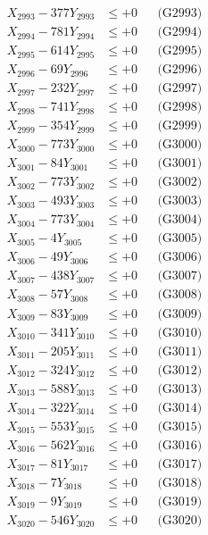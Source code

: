 \documentclass[a4paper,10pt]{article}
\begin{document}
{\begin{align}
X_{2993} - 377Y_{2993} &\leq +0 && \text{(G2993)} \\
X_{2994} - 781Y_{2994} &\leq +0 && \text{(G2994)} \\
X_{2995} - 614Y_{2995} &\leq +0 && \text{(G2995)} \\
X_{2996} - 69Y_{2996} &\leq +0 && \text{(G2996)} \\
X_{2997} - 232Y_{2997} &\leq +0 && \text{(G2997)} \\
X_{2998} - 741Y_{2998} &\leq +0 && \text{(G2998)} \\
X_{2999} - 354Y_{2999} &\leq +0 && \text{(G2999)} \\
X_{3000} - 773Y_{3000} &\leq +0 && \text{(G3000)} \\
\allowbreak
X_{3001} - 84Y_{3001} &\leq +0 && \text{(G3001)} \\
X_{3002} - 773Y_{3002} &\leq +0 && \text{(G3002)} \\
X_{3003} - 493Y_{3003} &\leq +0 && \text{(G3003)} \\
X_{3004} - 773Y_{3004} &\leq +0 && \text{(G3004)} \\
X_{3005} - 4Y_{3005} &\leq +0 && \text{(G3005)} \\
X_{3006} - 49Y_{3006} &\leq +0 && \text{(G3006)} \\
X_{3007} - 438Y_{3007} &\leq +0 && \text{(G3007)} \\
X_{3008} - 57Y_{3008} &\leq +0 && \text{(G3008)} \\
X_{3009} - 83Y_{3009} &\leq +0 && \text{(G3009)} \\
X_{3010} - 341Y_{3010} &\leq +0 && \text{(G3010)} \\
\allowbreak
X_{3011} - 205Y_{3011} &\leq +0 && \text{(G3011)} \\
X_{3012} - 324Y_{3012} &\leq +0 && \text{(G3012)} \\
X_{3013} - 588Y_{3013} &\leq +0 && \text{(G3013)} \\
X_{3014} - 322Y_{3014} &\leq +0 && \text{(G3014)} \\
X_{3015} - 553Y_{3015} &\leq +0 && \text{(G3015)} \\
X_{3016} - 562Y_{3016} &\leq +0 && \text{(G3016)} \\
X_{3017} - 81Y_{3017} &\leq +0 && \text{(G3017)} \\
X_{3018} - 7Y_{3018} &\leq +0 && \text{(G3018)} \\
X_{3019} - 9Y_{3019} &\leq +0 && \text{(G3019)} \\
X_{3020} - 546Y_{3020} &\leq +0 && \text{(G3020)} \\

\end{align}}
\end{document}
